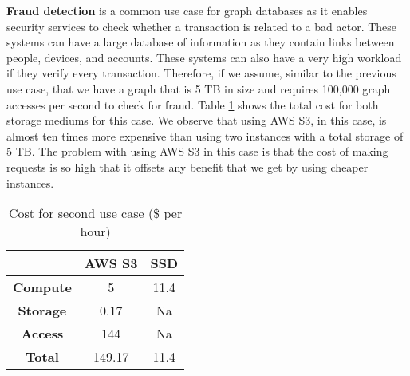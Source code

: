 \medskip
\textbf{Fraud detection} is a common use case for graph databases as it enables
security services to check whether a transaction is related to a bad actor. 
These systems can have a large database of information as they contain
links between people, devices, and accounts. These systems can also have a very
high workload if they verify every transaction. Therefore, if
we assume, similar to the previous use case, that we have a graph that is
5 TB in size and requires 100,000 graph accesses per second to check for
fraud. Table \ref{table:costFraudDetection} shows the total cost for both
storage mediums for this case. We observe that using AWS S3, in this case, is
almost ten times more expensive than using two instances with a total storage of
5 TB. The problem with using AWS S3 in this case is that the cost of making
requests is so high that it offsets any benefit that we get by using
cheaper instances.

\begin{table}[h!]
 \centering
 \begin{tabular}{|c | c | c |} 
 \hline
  & AWS S3 & SSD \\ [0.5ex] 
 \hline\hline
     \textbf{Compute} & 5 & 11.4 \\ 
     \textbf{Storage} & 0.17 & Na \\
     \textbf{Access} &  144 & Na \\
     \hline
     \textbf{Total} & 149.17 & 11.4 \\
 \hline
 \end{tabular}
 \caption{Cost for second use case (\$ per hour)}
 \label{table:costFraudDetection}
\end{table}

